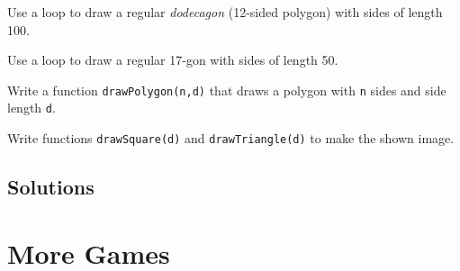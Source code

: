 \documentclass[11pt,a4paper]{report}
\begin{document}
\begin{ex}
Use a loop to draw a regular \emph{dodecagon} (12-sided polygon) with sides of length 100.
\end{ex}

\begin{ex}
Use a loop to draw a regular  17-gon with sides of length 50.
\end{ex}

\begin{ex}
Write a function \verb|drawPolygon(n,d)| that draws a polygon with \verb|n| sides and side length \verb|d|.
\end{ex}

\begin{ex}
\begin{multicols}{2}
Write functions \verb|drawSquare(d)| and \verb|drawTriangle(d)| to make the shown image.
\end{multicols}
\end{ex}



\newpage
\subsection*{Solutions}
\printcursols
\newpage

\section{More Games}
\end{document}
